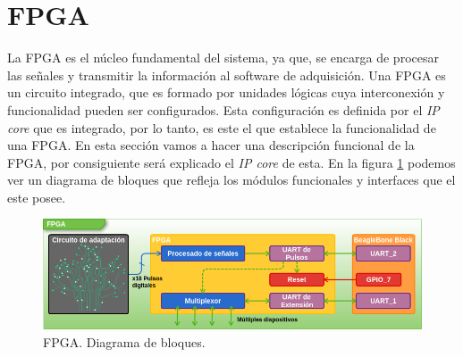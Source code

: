 \section{FPGA}
	La FPGA es el núcleo fundamental del sistema, ya que, se encarga de procesar las señales y transmitir la información al software de
	adquisición. Una FPGA es un circuito integrado, que es formado por unidades lógicas cuya interconexión y funcionalidad pueden ser
	configurados. Esta configuración es definida por el \emph{IP core} que es integrado, por lo tanto, es este el que establece la funcionalidad
	de una FPGA. En esta sección vamos a hacer una descripción funcional de la FPGA, por consiguiente será explicado el \emph{IP core} de esta.
	En la figura \ref{fig:fpga} podemos ver un diagrama de bloques que refleja los módulos funcionales y interfaces que el este posee.
	\begin{figure}[h]
		\centering
		\includegraphics[keepaspectratio, width=1\textwidth]{./img/fpga.png}
		\caption{FPGA. Diagrama de bloques.}
		\label{fig:fpga}
	\end{figure}	
